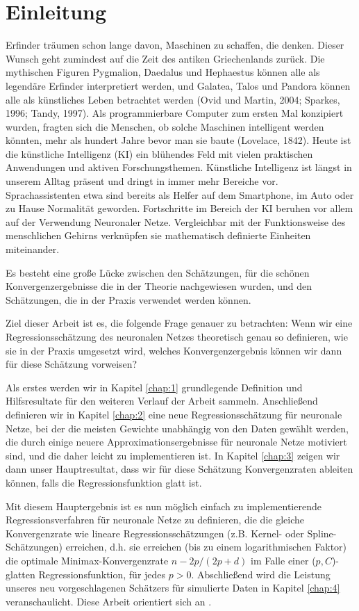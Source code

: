 \chapter*{Einleitung}

Erfinder träumen schon lange davon, Maschinen zu schaffen, die denken. Dieser Wunsch geht zumindest auf die Zeit des antiken Griechenlands zurück. Die mythischen Figuren Pygmalion, Daedalus und Hephaestus können alle als legendäre Erfinder interpretiert werden, und Galatea, Talos und Pandora können alle als künstliches Leben betrachtet werden (Ovid und Martin, 2004; Sparkes, 1996; Tandy, 1997).
Als programmierbare Computer zum ersten Mal konzipiert wurden, fragten sich die Menschen, ob solche Maschinen intelligent werden könnten, mehr als hundert Jahre bevor man sie baute (Lovelace, 1842). Heute ist die künstliche Intelligenz (KI) ein blühendes Feld mit vielen praktischen Anwendungen und aktiven Forschungsthemen. 
Künstliche Intelligenz ist längst in unserem Alltag präsent und dringt in immer mehr Bereiche vor. Sprachassistenten etwa sind bereits als Helfer auf dem Smartphone, im Auto oder zu Hause Normalität geworden. Fortschritte im Bereich der KI beruhen vor allem auf der Verwendung Neuronaler Netze. Vergleichbar mit der Funktionsweise des menschlichen Gehirns verknüpfen sie mathematisch definierte Einheiten miteinander.

Es besteht eine große Lücke zwischen den Schätzungen, für die schönen Konvergenzergebnisse die in der Theorie nachgewiesen wurden, und den Schätzungen, die in der Praxis verwendet werden können.

Ziel dieser Arbeit ist es, die folgende Frage genauer zu betrachten: Wenn wir eine Regressionsschätzung des neuronalen Netzes theoretisch genau so definieren, wie sie in der Praxis umgesetzt wird, welches Konvergenzergebnis können wir dann für diese Schätzung vorweisen? 

Als erstes werden wir in Kapitel \ref{chap:1} grundlegende Definition und Hilfsresultate für den weiteren Verlauf der Arbeit sammeln.
Anschließend definieren wir in Kapitel \ref{chap:2} eine neue Regressionsschätzung für neuronale Netze, bei der die meisten Gewichte unabhängig von den Daten gewählt werden, die durch einige neuere Approximationsergebnisse für neuronale Netze motiviert sind, und die daher leicht zu implementieren ist. In Kapitel \ref{chap:3} zeigen wir dann unser Hauptresultat, dass wir für diese Schätzung Konvergenzraten ableiten können, falls die Regressionsfunktion glatt ist. 

Mit diesem Hauptergebnis ist es nun möglich einfach zu implementierende Regressionsverfahren für neuronale Netze zu definieren, die die gleiche Konvergenzrate wie lineare Regressionsschätzungen (z.B. Kernel- oder Spline-Schätzungen) erreichen, d.h. sie erreichen (bis zu einem logarithmischen Faktor) die optimale Minimax-Konvergenzrate $n-2p/(2p+d)$ im Falle einer ($p,C$)-glatten Regressionsfunktion, für jedes $p > 0$.
Abschließend wird die Leistung unseres neu vorgeschlagenen Schätzers für simulierte Daten in Kapitel \ref{chap:4} veranschaulicht. Diese Arbeit orientiert sich an \cite{kohler19}.
